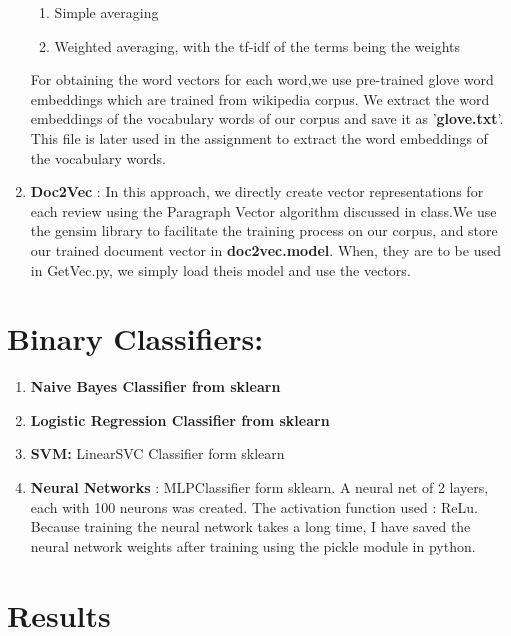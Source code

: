 \documentclass{article}
\begin{document}
\begin{enumerate}
    \begin{enumerate}
        \item Simple averaging
        \item Weighted averaging, with the tf-idf of the terms being the weights
    \end{enumerate}
    For obtaining the word vectors for each word,we use pre-trained glove word embeddings which are trained from wikipedia corpus. We extract the word embeddings of the vocabulary words of our corpus and save it as '\textbf{glove.txt}'. This file is later used in the assignment to extract the word embeddings of the vocabulary words.
    \item \textbf{Doc2Vec} : In this approach, we directly create vector representations for each review using the Paragraph Vector algorithm discussed in class.We use the gensim library to facilitate the training process on our corpus, and store our trained document vector in \textbf{doc2vec.model}. When, they are to be used in GetVec.py, we simply load theis model and use the vectors.
\end{enumerate}


\section{Binary Classifiers:}


\begin{enumerate}
    \item \textbf{Naive Bayes Classifier from sklearn}
    \item \textbf{Logistic Regression Classifier from sklearn}
    \item \textbf{SVM: } LinearSVC Classifier form sklearn
    \item \textbf{Neural Networks} : MLPClassifier form sklearn. A neural net of 2 layers, each with 100 neurons was created. The activation function used : ReLu. Because training the neural network takes a long time, I have saved the neural network weights after training using the pickle module in python.

\end{enumerate}

\section{Results}
\end{document}
